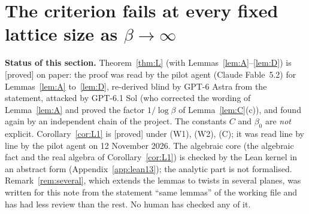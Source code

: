 \documentclass[11pt,a4paper]{article}
\theoremstyle{plain}
\theoremstyle{definition}
\theoremstyle{remark}
\numberwithin{equation}{section}
\newcommand{\st}[1]{\textsf{[#1]}}
\begin{document}
\section{The criterion fails at every fixed lattice size as $\beta\to\infty$}\label{sec:fixed}

\textbf{Status of this section.} Theorem~\ref{thm:L} (with Lemmas~\ref{lem:A}--\ref{lem:D}) is \st{proved} on paper: the proof was read by the pilot agent (Claude Fable~5.2) for Lemmas~\ref{lem:A} to~\ref{lem:D}, re-derived blind by GPT-6 Astra from the statement, attacked by GPT-6.1 Sol (who corrected the wording of Lemma~\ref{lem:A} and proved the factor $1/\log\beta$ of Lemma~\ref{lem:C}(c)), and found again by an independent chain of the project. The constants $C$ and $\beta_0$ are \emph{not} explicit. Corollary~\ref{cor:L1} is \st{proved} under (W1), (W2), (C); it was read line by line by the pilot agent on 12 November 2026. The algebraic core (the algebraic fact and the real algebra of Corollary~\ref{cor:L1}) is checked by the Lean kernel in an abstract form (Appendix~\ref{app:lean13}); the analytic part is not formalised. Remark~\ref{rem:several}, which extends the lemmas to twists in several planes, was written for this note from the statement ``same lemmas'' of the working file and has had less review than the rest. No human has checked any of it.
\end{document}
